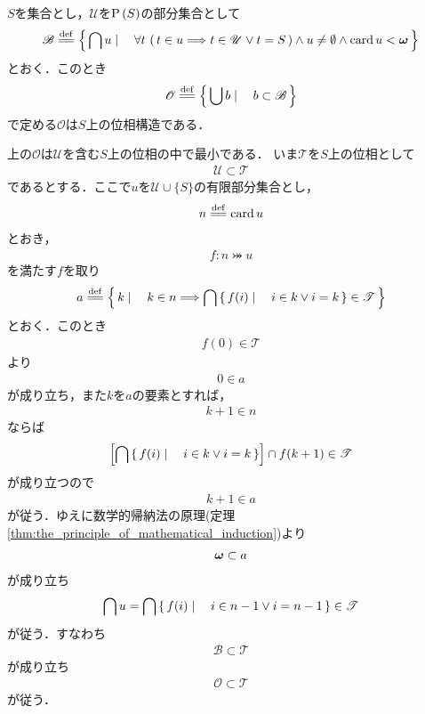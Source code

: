 	\begin{screen}
		\begin{thm}[位相の生成]\label{thm:generation_of_topology}
			$S$を集合とし，$\mathscr{U}$を$\operatorname*{P} \left(S\right)$の部分集合として
			\begin{align}
				\mathscr{B} \defeq \Set{\bigcap u}{
				\forall t\, \left(\, t \in u \Longrightarrow t \in \mathscr{U} \vee t = S\, \right) \wedge u \neq \emptyset \wedge \card{u} < \Natural}
			\end{align}
			とおく．このとき
			\begin{align}
				\mathscr{O} \defeq \Set{\bigcup b}{b \subset \mathscr{B}}
			\end{align}
			で定める$\mathscr{O}$は$S$上の位相構造である．
		\end{thm}
	\end{screen}
	
	上の$\mathscr{O}$は$\mathscr{U}$を含む$S$上の位相の中で最小である．
	いま$\mathscr{T}$を$S$上の位相として
	\begin{align}
		\mathscr{U} \subset \mathscr{T}
	\end{align}
	であるとする．ここで$u$を$\mathscr{U} \cup \{S\}$の有限部分集合とし，
	\begin{align}
		n \defeq \card{u}
	\end{align}
	とおき，
	\begin{align}
		f:n \bij u
	\end{align}
	を満たす$f$を取り
	\begin{align}
		a \defeq \Set{k}{k \in n \Longrightarrow \bigcap \Set{f(i)}{i \in k \vee i = k} \in \mathscr{T}}
	\end{align}
	とおく．このとき
	\begin{align}
		f(0) \in \mathscr{T}
	\end{align}
	より
	\begin{align}
		0 \in a
	\end{align}
	が成り立ち，また$k$を$a$の要素とすれば，
	\begin{align}
		k+1 \in n
	\end{align}
	ならば
	\begin{align}
		\left[ \bigcap \left\{\, f(i) \mid \quad i \in k \vee i = k\, \right\} \right] \cap f(k+1)
		\in \mathscr{T}
	\end{align}
	が成り立つので
	\begin{align}
		k+1 \in a
	\end{align}
	が従う．ゆえに数学的帰納法の原理(定理\ref{thm:the_principle_of_mathematical_induction})より
	\begin{align}
		{\boldsymbol \omega} \subset a
	\end{align}
	が成り立ち
	\begin{align}
		\bigcap u = \bigcap \left\{\, f(i) \mid \quad i \in n-1 \vee i = n-1\, \right\} \in \mathscr{T}
	\end{align}
	が従う．すなわち
	\begin{align}
		\mathscr{B} \subset \mathscr{T}
	\end{align}
	が成り立ち
	\begin{align}
		\mathscr{O} \subset \mathscr{T}
	\end{align}
	が従う．
	
